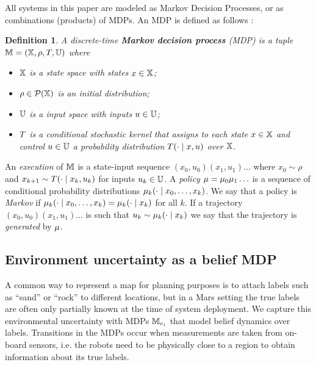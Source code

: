 \documentclass[conference]{IEEEtran}
\newtheorem{definition}{Definition}
\begin{document}
All systems in this paper are modeled as Markov Decision Processes, or as combinations (products) of MDPs. An MDP is defined as follows \cite{Bertsekas1978}:

\begin{definition}
\label{def:MDP}
  A discrete-time \textbf{Markov decision process} (MDP) is a tuple $\mathbb{M} = (\mathbb{X}, \rho, T, \mathbb{U})$ where
  \begin{itemize}
    \item $\mathbb{X}$ is a state space with states $x\in\mathbb{X}$; %
    \item $\rho \in \mathcal P (\mathbb{X})$ is an initial distribution;
    \item $\mathbb{U}$ is a input space with inputs $u\in\mathbb{U}$;
    \item $T$ is a conditional stochastic kernel that assigns to each state $x\in \mathbb{X}$ and control $u\in \mathbb{U}$ a probability distribution $T(\cdot\mid x,u)$ over $\mathbb{X}$.
  \end{itemize}
\end{definition}

An \emph{execution} of $\mathbb{M}$ is a state-input sequence $(x_0, u_0)(x_1, u_1)\ldots$ where $x_0 \sim \rho$ and $x_{k+1} \sim T(\cdot \mid x_k, u_k)$ for inputs $u_k \in \mathbb{U}$. A \emph{policy} $\mu = \mu_0 \mu_1 \ldots$ is a sequence of conditional probability distributions $\mu_k( \cdot \mid x_0, \ldots, x_{k})$. We say that a policy is \emph{Markov} if $\mu_k( \cdot \mid x_0, \ldots, x_{k}) = \mu_k( \cdot \mid x_{k})$ for all $k$. If a trajectory $(x_0, u_0)(x_1, u_1)\ldots$ is such that $u_k \sim \mu_k ( \cdot \mid x_{k})$ we say that the trajectory is \emph{generated} by $\mu$.


\subsection{Environment uncertainty as a belief MDP}

A common way to represent a map for planning purposes is to attach labels such as ``sand'' or ``rock'' to different locations, but in a Mars setting the true labels are often only partially known at the time of system deployment. We capture this environmental uncertainty with MDPs $\mathbb{M}_{e_i}$ that model belief dynamics over labels. Transitions in the MDPs occur when measurements are taken from on-board sensors, i.e. the robots need to be physically close to a region to obtain information about its true labels. 

\end{document}
